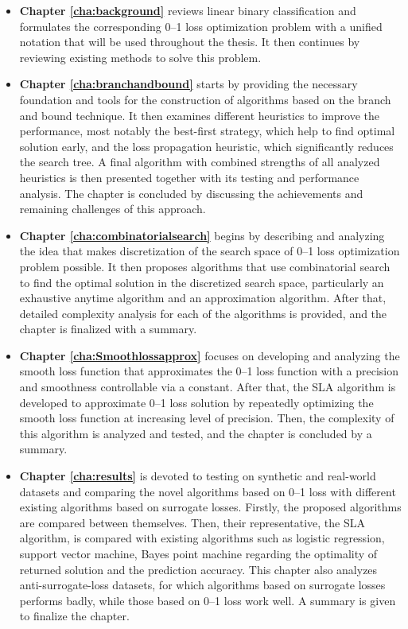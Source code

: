 \begin{itemize}

\item {\bf Chapter \ref{cha:background}} reviews linear binary classification and formulates the corresponding 0--1 loss optimization problem with a unified notation that will be used throughout the thesis. It then continues by reviewing existing methods to solve this problem. 

\item {\bf Chapter \ref{cha:branchandbound}} starts by providing the necessary foundation and tools for the construction of algorithms based on the branch and bound technique. It then examines different heuristics to improve the performance, most notably the best-first strategy, which help to find optimal solution early, and the loss propagation heuristic, which significantly reduces the search tree. A final algorithm with combined strengths of all analyzed heuristics is then presented together with its testing and performance analysis. The chapter is concluded by discussing the achievements and remaining challenges of this approach.  

\item {\bf Chapter \ref{cha:combinatorialsearch}} begins by describing and analyzing the idea that makes discretization of the search space of 0--1 loss optimization problem possible. It then proposes algorithms that use combinatorial search to find the optimal solution in the discretized search space, particularly an exhaustive anytime algorithm and an approximation algorithm. After that, detailed complexity analysis for each of the algorithms is provided, and the chapter is finalized with a summary.

\item {\bf Chapter \ref{cha:Smoothlossapprox}} focuses on developing and analyzing the smooth loss function that approximates the 0--1 loss function with a precision and smoothness controllable via a constant. After that, the SLA algorithm is developed to approximate 0--1 loss solution by repeatedly optimizing the smooth loss function at increasing level of precision. Then, the complexity of this algorithm is analyzed and tested, and the chapter is concluded by a summary.  

\item {\bf Chapter \ref{cha:results}} is devoted to testing on synthetic and real-world datasets and comparing the novel algorithms based on 0--1 loss with different existing algorithms based on surrogate losses. Firstly, the proposed algorithms are compared between themselves. Then, their representative, the SLA algorithm, is compared with existing algorithms such as logistic regression, support vector machine, Bayes point machine regarding the optimality of returned solution and the prediction accuracy. This chapter also analyzes anti-surrogate-loss datasets, for which algorithms based on surrogate losses performs badly, while  those based on 0--1 loss work well. A summary is given to finalize the chapter.


\end{itemize}
